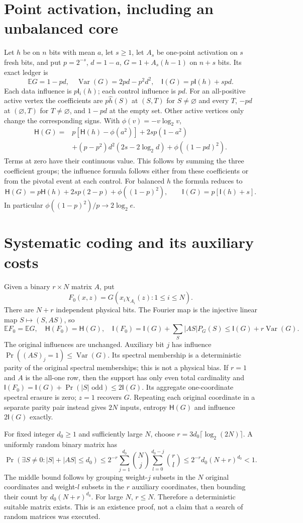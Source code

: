\documentclass[11pt]{article}
\newcommand{\I}{\mathsf I}\newcommand{\HH}{\mathsf H}
\newcommand{\Var}{\operatorname{Var}}
\newcommand{\E}{\mathbb E}
\begin{document}
\section{Point activation, including an unbalanced core}
Let $h$ be on $n$ bits with mean $a$, let $s\ge1$, let $A_s$ be one-point
activation on $s$ fresh bits, and put $p=2^{-s}$, $d=1-a$,
$G=1+A_s(h-1)$ on $n+s$ bits. Its exact ledger is
\[
 \E G=1-pd,\quad \Var(G)=2pd-p^2d^2,\quad
 \I(G)=p\I(h)+spd.
\]
Each data influence is $p\I_i(h)$; each control influence is $pd$.
For an all-positive active vertex the coefficients are $p\widehat h(S)$
at $(S,T)$ for $S\ne\varnothing$ and every $T$, $-pd$ at
$(\varnothing,T)$ for $T\ne\varnothing$, and $1-pd$ at the empty set.
Other active vertices only change the corresponding signs.
With $\phi(v)=-v\log_2v$,
\[
\begin{split}
 \HH(G)={}&p[\HH(h)-\phi(a^2)]+2sp(1-a^2)\\
 &+(p-p^2)d^2(2s-2\log_2d)+\phi((1-pd)^2).
\end{split}
\]
Terms at zero have their continuous value. This follows by summing the three
coefficient groups; the influence formula follows either from these coefficients
or from the pivotal event at each control.
For balanced $h$ the formula reduces to
\[
 \HH(G)=p\HH(h)+2sp(2-p)+\phi((1-p)^2),\qquad
 \I(G)=p[\I(h)+s].
\]
In particular $\phi((1-p)^2)/p\to2\log_2 e$.

\section{Systematic coding and its auxiliary costs}
Given a binary $r\times N$ matrix $A$, put
\[
 F_0(x,z)=G(x_i\chi_{A_i}(z):1\le i\le N).
\]
There are $N+r$ independent physical bits. The Fourier map is the injective
linear map $S\mapsto(S,AS)$, so
\[
 \E F_0=\E G,\quad\HH(F_0)=\HH(G),\quad
 \I(F_0)=\I(G)+\sum_S|AS|P_G(S)\le\I(G)+r\Var(G).
\]
The original influences are unchanged. Auxiliary bit $j$ has influence
$\Pr((AS)_j=1)\le\Var(G)$. Its spectral membership is a deterministic
parity of the original spectral memberships; this is not a physical bias.
If $r=1$ and $A$ is the all-one row, then the support has only even total
cardinality and $\I(F_0)=\I(G)+\Pr(|S|\text{ odd})\le2\I(G)$.
Its aggregate one-coordinate spectral erasure is zero; $z=1$ recovers $G$.
Repeating each original coordinate in a separate parity pair instead gives
$2N$ inputs, entropy $\HH(G)$ and influence $2\I(G)$ exactly.

For fixed integer $d_0\ge1$ and sufficiently large $N$, choose
$r=3d_0\lceil\log_2(2N)\rceil$. A uniformly random binary matrix has
\[
\Pr(\exists S\ne0:|S|+|AS|\le d_0)
\le2^{-r}\sum_{j=1}^{d_0}\binom Nj
        \sum_{l=0}^{d_0-j}\binom rl
\le2^{-r}d_0(N+r)^{d_0}<1.
\]
The middle bound follows by grouping weight-$j$ subsets in the $N$ original
coordinates and weight-$l$ subsets in the $r$ auxiliary coordinates, then
bounding their count by $d_0(N+r)^{d_0}$. For large $N$, $r\le N$.
Therefore a deterministic suitable matrix exists. This is an existence proof,
not a claim that a search of random matrices was executed.
\end{document}
